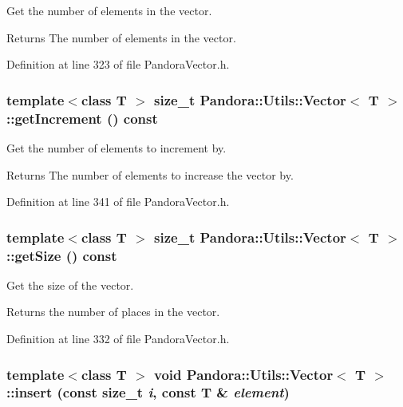 Get the number of elements in the vector. \begin{DoxyReturn}{Returns}
The number of elements in the vector. 
\end{DoxyReturn}


Definition at line 323 of file PandoraVector.h.\hypertarget{classPandora_1_1Utils_1_1Vector_aee155c4f9a304e540e359af6d3fec3d8}{
\subsubsection[{getIncrement}]{\setlength{\rightskip}{0pt plus 5cm}template$<$class T $>$ size\_\-t {\bf Pandora::Utils::Vector}$<$ T $>$::getIncrement () const}}
\label{classPandora_1_1Utils_1_1Vector_aee155c4f9a304e540e359af6d3fec3d8}


Get the number of elements to increment by. \begin{DoxyReturn}{Returns}
The number of elements to increase the vector by. 
\end{DoxyReturn}


Definition at line 341 of file PandoraVector.h.\hypertarget{classPandora_1_1Utils_1_1Vector_a8df1cb3c4cc21dca4b093eed28c62b9a}{
\subsubsection[{getSize}]{\setlength{\rightskip}{0pt plus 5cm}template$<$class T $>$ size\_\-t {\bf Pandora::Utils::Vector}$<$ T $>$::getSize () const}}
\label{classPandora_1_1Utils_1_1Vector_a8df1cb3c4cc21dca4b093eed28c62b9a}


Get the size of the vector. \begin{DoxyReturn}{Returns}
the number of places in the vector. 
\end{DoxyReturn}


Definition at line 332 of file PandoraVector.h.\hypertarget{classPandora_1_1Utils_1_1Vector_a8757e06ea29132d0b8873a13b6c1d956}{
\subsubsection[{insert}]{\setlength{\rightskip}{0pt plus 5cm}template$<$class T $>$ void {\bf Pandora::Utils::Vector}$<$ T $>$::insert (const size\_\-t {\em i}, \/  const T \& {\em element})}}
\label{classPandora_1_1Utils_1_1Vector_a8757e06ea29132d0b8873a13b6c1d956}


